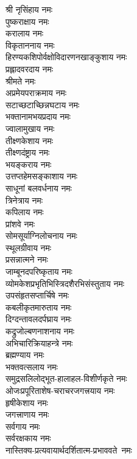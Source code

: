 \begin{multicols}{2}
\begin{flushleft}
श्री नृसिंहाय नमः\\
पुष्कराक्षाय नमः\\
करालाय नमः\\
विकृताननाय नमः\\
हिरण्यकशिपोर्वक्षोविदारणनखाङ्कुशाय नमः\\
प्रह्लादवरदाय नमः\\
श्रीमते नमः\\
अप्रमेयपराक्रमाय नमः\\
सटाच्छटाच्छिन्नघटाय नमः\\
भक्तानामभयप्रदाय नमः\hfill{}\\
ज्वालामुखाय नमः\\
तीक्ष्णकेशाय नमः\\
तीक्ष्णदंष्ट्राय नमः\\
भयङ्कराय नमः\\
उत्तप्तहेमसङ्काशाय नमः\\
साधूनां बलवर्धनाय नमः\\
त्रिनेत्राय नमः\\
कपिलाय नमः\\
प्रांशवे नमः\\
सोमसूर्याग्निलोचनाय नमः\hfill{}\\
स्थूलग्रीवाय नमः\\
प्रसन्नात्मने नमः\\
जाम्बूनदपरिष्कृताय नमः\\
व्योमकेशप्रभृतिभिस्त्रिदशैरभिसंस्तुताय नमः\\
उपसंहृतसप्तार्चिषे नमः\\
कबलीकृतमारुताय नमः\\
दिग्दन्तावलदर्पघ्राय नमः\\
कद्रुजोल्बणनाशनाय नमः\\
अभिचारिक्रियाहन्त्रे नमः\\
ब्रह्मण्याय नमः\hfill{}\\
भक्तवत्सलाय नमः\\
समुद्रसलिलोद्भूत-हालाहल-विशीर्णकृते नमः\\
ओजःप्रपूरिताशेष-चराचरजगत्त्रयाय नमः\\
हृषीकेशाय नमः\\
जगत्त्राणाय नमः\\
सर्वगाय नमः\\
सर्वरक्षकाय नमः\\
नास्तिक्य-प्रत्यवायार्थदर्शितात्म-प्रभाववते~नमः\\

\end{flushleft}
\end{multicols}
